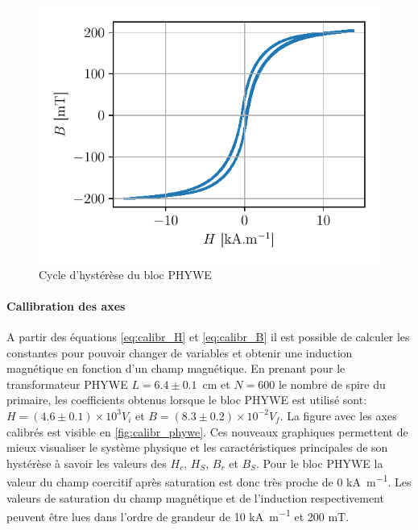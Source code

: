\begin{minipage}{\linewidth}
    \begin{figure}
        \includegraphics[width=\linewidth]{figures/G1-phywe-avec-bloc_chang.pdf}
        \caption{Cycle d'hystérèse du bloc PHYWE}
        \label{fig:calibr_phywe}
    \end{figure}

    \paragraph{Callibration des axes}
    A partir des équations \autoref{eq:calibr_H} et \autoref{eq:calibr_B} il est possible de calculer les constantes pour pouvoir changer de variables et obtenir une induction magnétique en fonction d'un champ magnétique. En prenant pour le transformateur PHYWE \mbox{\(L = 6.4 \pm 0.1\) \si{\centi \meter}} et \(N = 600\) le nombre de spire du primaire, les coefficients obtenus lorsque le bloc PHYWE est utilisé sont: \mbox{\(H = (4.6\pm0.1)\times10^3 V_i\)} et \mbox{\(B = (8.3\pm0.2)\times10^{-2} V_f\)}. La figure avec les axes calibrés est visible en \autoref{fig:calibr_phywe}.
    Ces nouveaux graphiques permettent de mieux visualiser le système physique et les caractéristiques principales de son hystérèse à savoir les valeurs des \(H_c\), \(H_S\), \(B_r\) et \(B_S\). Pour le bloc PHYWE la valeur du champ coercitif après saturation est donc très proche de 0 \si{\kilo\ampere\per\meter}. Les valeurs de saturation  du champ magnétique et de l'induction respectivement peuvent être lues dans l'ordre de grandeur de 10 \si{\kilo\ampere\per\meter} et 200 \si{\milli\tesla}.
\end{minipage}

